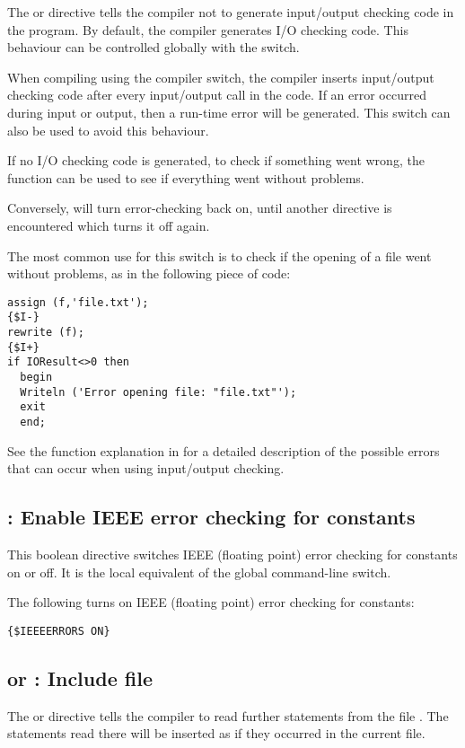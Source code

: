 The  or  directive tells the compiler
not to generate input/output checking code in the program. By default, the
compiler generates I/O checking code. This behaviour can be controlled
globally with the  switch.

When compiling using the  compiler switch, the \fpc compiler inserts
input/output checking code after every input/output call in the code.
If an error occurred during input or output, then a run-time error will
be generated. This switch can also be used to avoid this behaviour.

If no I/O checking code is generated, to check if something went wrong, 
the  function can be used to see if everything went without 
problems.

Conversely,  will turn error-checking back on, until another
directive is encountered which turns it off again.

The most common use for this switch is to check if the opening of a file
went without problems, as in the following piece of code:
\begin{verbatim}
assign (f,'file.txt');
{$I-}
rewrite (f);
{$I+}
if IOResult<>0 then
  begin
  Writeln ('Error opening file: "file.txt"');
  exit
  end;
\end{verbatim}
See the  function explanation in  for a
detailed description of the possible errors that can occur when using
input/output checking.

\subsection{ : Enable IEEE error checking for constants }
This boolean directive switches IEEE (floating point) error checking for constants on
or off. It is the local equivalent of the global  command-line switch.

The following turns on IEEE (floating point) error checking for constants:
\begin{verbatim}
{$IEEEERRORS ON}
\end{verbatim}

\subsection{ or  : Include file }

The  or  directive
tells the compiler to read further statements from the file .
The statements read there will be inserted as if they occurred in the
current file.

